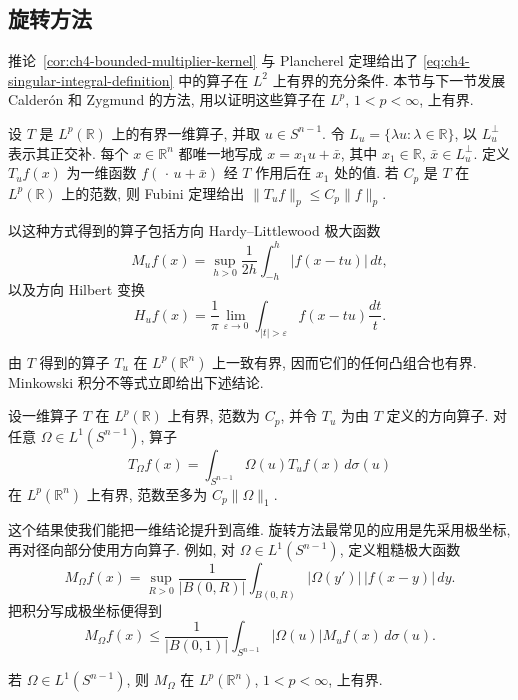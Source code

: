 \subsection{旋转方法}
\label{sec:ch4-method-of-rotations}

推论~\ref{cor:ch4-bounded-multiplier-kernel} 与 Plancherel 定理给出了 \eqref{eq:ch4-singular-integral-definition} 中的算子在 $L^2$ 上有界的充分条件. 本节与下一节发展 Calderón 和 Zygmund 的方法, 用以证明这些算子在 $L^p$, $1<p<\infty$, 上有界.

设 $T$ 是 $L^p(\mathbb R)$ 上的有界一维算子, 并取 $u\in S^{n-1}$. 令 $L_u=\{\lambda u:\lambda\in\mathbb R\}$, 以 $L_u^\perp$ 表示其正交补. 每个 $x\in\mathbb R^n$ 都唯一地写成 $x=x_1u+\bar x$, 其中 $x_1\in\mathbb R$, $\bar x\in L_u^\perp$. 定义 $T_uf(x)$ 为一维函数 $f(\,\cdot\,u+\bar x)$ 经 $T$ 作用后在 $x_1$ 处的值. 若 $C_p$ 是 $T$ 在 $L^p(\mathbb R)$ 上的范数, 则 Fubini 定理给出 $\|T_uf\|_p\le C_p\|f\|_p$.

\hypertarget{chapter-04-page-086}{}
以这种方式得到的算子包括方向 Hardy--Littlewood 极大函数
\[
 M_uf(x)=\sup_{h>0}\frac1{2h}\int_{-h}^h|f(x-tu)|\,dt,
\]
以及方向 Hilbert 变换
\[
 H_uf(x)=\frac1\pi\lim_{\varepsilon\to0}
 \int_{|t|>\varepsilon}f(x-tu)\frac{dt}{t}.
\]

由 $T$ 得到的算子 $T_u$ 在 $L^p(\mathbb R^n)$ 上一致有界, 因而它们的任何凸组合也有界. Minkowski 积分不等式立即给出下述结论.

\begin{Proposition}
\label{prop:ch4-directional-operator-average}
设一维算子 $T$ 在 $L^p(\mathbb R)$ 上有界, 范数为 $C_p$, 并令 $T_u$ 为由 $T$ 定义的方向算子. 对任意 $\Omega\in L^1(S^{n-1})$, 算子
\[
 T_\Omega f(x)=\int_{S^{n-1}}\Omega(u)T_uf(x)\,d\sigma(u)
\]
在 $L^p(\mathbb R^n)$ 上有界, 范数至多为 $C_p\|\Omega\|_1$.
\end{Proposition}

这个结果使我们能把一维结论提升到高维. 旋转方法最常见的应用是先采用极坐标, 再对径向部分使用方向算子. 例如, 对 $\Omega\in L^1(S^{n-1})$, 定义粗糙极大函数
\begin{equation}
\label{eq:ch4-rough-maximal-function}
 M_\Omega f(x)=\sup_{R>0}\frac1{|B(0,R)|}
 \int_{B(0,R)}|\Omega(y')|\,|f(x-y)|\,dy.
\end{equation}
把积分写成极坐标便得到
\[
 M_\Omega f(x)\le\frac1{|B(0,1)|}
 \int_{S^{n-1}}|\Omega(u)|M_uf(x)\,d\sigma(u).
\]

\hypertarget{chapter-04-page-087}{}
\begin{Corollary}
\label{cor:ch4-rough-maximal-lp}
若 $\Omega\in L^1(S^{n-1})$, 则 $M_\Omega$ 在 $L^p(\mathbb R^n)$, $1<p<\infty$, 上有界.
\end{Corollary}

